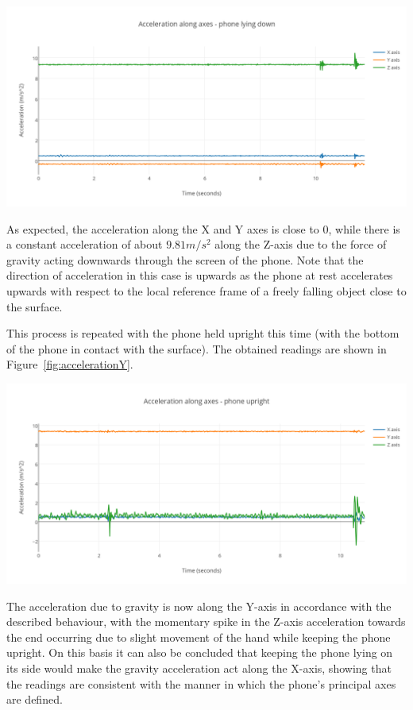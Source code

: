 \documentclass[12pt,a4paper]{report}
\begin{document}
\begin{center}
\includegraphics[scale=0.9]{images/accelerationZ.png}
\label{fig:accelerationZ}
\end{center}

As expected, the acceleration along the X and Y axes is close to 0, while there is a constant acceleration of about $9.81 m/s^2$ along the Z-axis due to the force of gravity acting downwards through the screen of the phone. Note that the direction of acceleration in this case is upwards as the phone at rest accelerates upwards with respect to the local reference frame of a freely falling object close to the surface. 

This process is repeated with the phone held upright this time (with the bottom of the phone in contact with the surface). The obtained readings are shown in Figure~\ref{fig:accelerationY}.

\begin{center}
\includegraphics[scale=0.9]{images/accelerationY.png}
\label{fig:accelerationY}
\end{center}

The acceleration due to gravity is now along the Y-axis in accordance with the described behaviour, with the momentary spike in the Z-axis acceleration towards the end occurring due to slight movement of the hand while keeping the phone upright. On this basis it can also be concluded that keeping the phone lying on its side would make the gravity acceleration act along the X-axis, showing that the readings are consistent with the manner in which the phone's principal axes are defined. 
 
\end{document}
